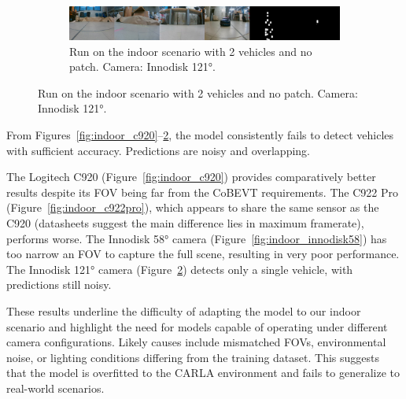 \begin{figure}[tph]
    \begin{subfigure}[b]{1\textwidth}
        \centering
        \includegraphics[width=\textwidth]{figures/results/0000_innodisk120.png}
        \caption{Run on the indoor scenario with 2 vehicles and no patch. Camera: Innodisk 121°.}
        \label{fig:indoor_innodisk120}
    \end{subfigure}
\end{figure}

From Figures~\ref{fig:indoor_c920}--\ref{fig:indoor_innodisk120}, the model consistently fails to detect vehicles with sufficient accuracy. Predictions are noisy and overlapping.  

The Logitech C920 (Figure~\ref{fig:indoor_c920}) provides comparatively better results despite its FOV being far from the CoBEVT requirements. The C922 Pro (Figure~\ref{fig:indoor_c922pro}), which appears to share the same sensor as the C920 (datasheets suggest the main difference lies in maximum framerate), performs worse. The Innodisk 58° camera (Figure~\ref{fig:indoor_innodisk58}) has too narrow an FOV to capture the full scene, resulting in very poor performance. The Innodisk 121° camera (Figure~\ref{fig:indoor_innodisk120}) detects only a single vehicle, with predictions still noisy.  

These results underline the difficulty of adapting the model to our indoor scenario and highlight the need for models capable of operating under different camera configurations. Likely causes include mismatched FOVs, environmental noise, or lighting conditions differing from the training dataset. This suggests that the model is overfitted to the CARLA environment and fails to generalize to real-world scenarios.  
